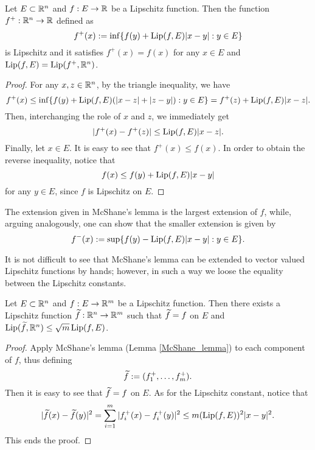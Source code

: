 \begin{lemma} \label{McShane_lemma}
Let $E \subset \mathbb{R}^{n}$ and $f: E \to \mathbb{R}$ be a Lipschitz function. Then the function $f^{+} : \mathbb{R}^{n} \to \mathbb{R}$ defined as
\begin{equation*}
f^{+}(x) := \inf \{ f(y) + \operatorname{Lip}(f, E) |x - y| : y \in E\}
\end{equation*}
is Lipschitz and it satisfies $f^{+}(x) = f(x)$ for any $x \in E$ and $\operatorname{Lip}(f, E) = \operatorname{Lip}(f^{+}, \mathbb{R}^{n})$.
\end{lemma}
\begin{proof}
For any $x, z \in \mathbb{R}^{n}$, by the triangle inequality, we have
\begin{equation*}
f^{+}(x) \le \inf \{ f(y) + \operatorname{Lip}(f, E) (|x - z| + |z - y|) : y \in E \} = f^{+}(z) + \operatorname{Lip}(f, E) |x - z|.
\end{equation*}
Then, interchanging the role of $x$ and $z$, we immediately get
\begin{equation*}
|f^{+}(x) - f^{+}(z)| \le \operatorname{Lip}(f, E) |x - z|.
\end{equation*}
Finally, let $x \in E$. It is easy to see that $f^{+}(x) \le f(x)$. In order to obtain the reverse inequality, notice that 
\begin{equation*}
f(x) \le f(y) + \operatorname{Lip}(f, E)|x - y|
\end{equation*}
for any $y \in E$, since $f$ is Lipschitz on $E$.
\end{proof}

\begin{remark} The extension given in McShane's lemma is the largest extension of $f$, while, arguing analogously, one can show that the smaller extension is given by
\begin{equation*}
f^{-}(x) := \sup \{ f(y) - \operatorname{Lip}(f, E) |x - y| : y \in E \}.
\end{equation*}
\end{remark}

It is not difficult to see that McShane's lemma can be extended to vector valued Lipschitz functions by hands; however, in such a way we loose the equality between the Lipschitz constants.

\begin{corollary}
Let $E \subset \mathbb{R}^{n}$ and $f: E \to \mathbb{R}^{m}$ be a Lipschitz function. Then there exists a Lipschitz function $\widetilde{ f} : \mathbb{R}^{n} \to \mathbb{R}^{m}$ such that $\widetilde{ f} = f$ on $E$ and $\operatorname{Lip}(\widetilde{ f}, \mathbb{R}^{n}) \le \sqrt{m} \operatorname{Lip}(f, E)$.
\end{corollary}
\begin{proof}
Apply McShane's lemma (Lemma \ref{McShane_lemma}) to each component of $f$, thus defining
\begin{equation*}
\widetilde{ f} := (f_{1}^{+}, \dots, f_{m}^{+}).
\end{equation*}
Then it is easy to see that $\widetilde{ f}= f$ on $E$. As for the Lipschitz constant, notice that
\begin{equation*}
|\widetilde{ f}(x) - \widetilde{ f}(y)|^{2} = \sum_{i = 1}^{m}|f_{i}^{+}(x) - f_{i}^{+}(y)|^{2} \le m (\operatorname{Lip}(f, E))^{2} |x - y|^2.
\end{equation*}
This ends the proof.
\end{proof}

